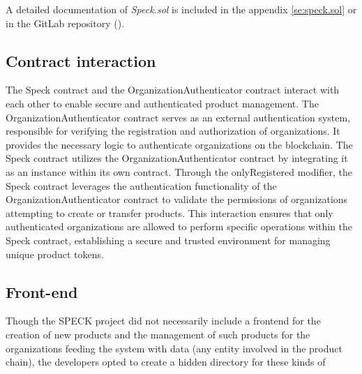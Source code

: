 \documentclass[oneside,a4paper,12pt, colorinlistoftodos]{article} %
\begin{document}
A detailed documentation of \textit{Speck.sol} is included in the appendix \ref{se:speck.sol} or in the GitLab repository (\cite{HellerAoun}).

\subsection{Contract interaction}
The Speck contract and the OrganizationAuthenticator contract interact with each other to enable secure and authenticated product management. The OrganizationAuthenticator contract serves as an external authentication system, responsible for verifying the registration and authorization of organizations. It provides the necessary logic to authenticate organizations on the blockchain. The Speck contract utilizes the OrganizationAuthenticator contract by integrating it as an instance within its own contract. Through the onlyRegistered modifier, the Speck contract leverages the authentication functionality of the OrganizationAuthenticator contract to validate the permissions of organizations attempting to create or transfer products. This interaction ensures that only authenticated organizations are allowed to perform specific operations within the Speck contract, establishing a secure and trusted environment for managing unique product tokens.

\subsection{Front-end}

Though the SPECK project did not necessarily include a frontend for the creation of new products and the management of such products for the organizations feeding the system with data (any entity involved in the product chain), the developers opted to create a hidden directory for these kinds of 
\end{document}
